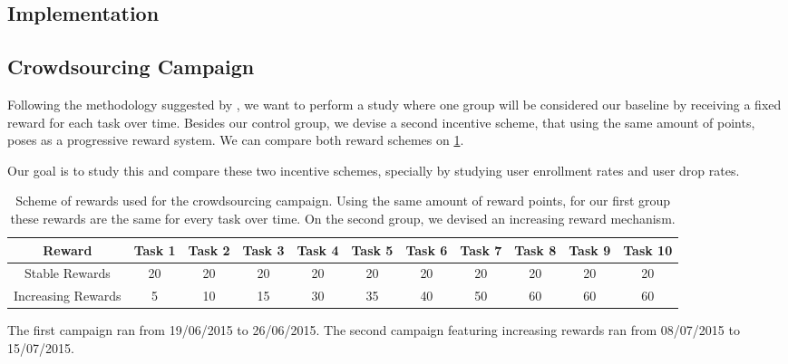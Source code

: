 \documentclass[letterpaper]{article}
\begin{document}
\subsection{Implementation}




\subsection{Crowdsourcing Campaign}

Following the methodology suggested by \cite{Choi2014}, we want to perform a study where one group will be considered our baseline by receiving a fixed reward for each task over time.
Besides our control group, we devise a second incentive scheme, that using the same amount of points, poses as a progressive reward system. We can compare both reward schemes on \ref{tab:rewards}.

Our goal is to study this and compare these two incentive schemes, specially by studying user enrollment rates and user drop rates.

\begin{table}[!h]
	\caption{ Scheme of rewards used for the crowdsourcing campaign. Using the same amount of reward points, for our first group these rewards are the same for every task over time. On the second group, we devised an increasing reward mechanism. }
	\begin{center}
\begin{tabular}{|c|c|c|c|c|c|c|c|c|c|c|}
	\hline  Reward & Task 1  & Task 2  & Task 3  & Task 4 & Task 5 & Task 6 & Task 7 & Task 8 & Task 9 & Task 10 \\ 
	\hline  Stable Rewards & 20 & 20 & 20 & 20 & 20 & 20 & 20 & 20 & 20 & 20 \\ 
	\hline Increasing Rewards & 5 & 10 & 15 & 30 & 35 & 40 & 50 & 60 & 60 & 60 \\ 
	\hline 
\end{tabular} 
\end{center}
\label{tab:rewards}
\end{table}


The first campaign ran from 19/06/2015 to 26/06/2015. The second campaign featuring increasing rewards ran from 08/07/2015 to 15/07/2015.
\end{document}
